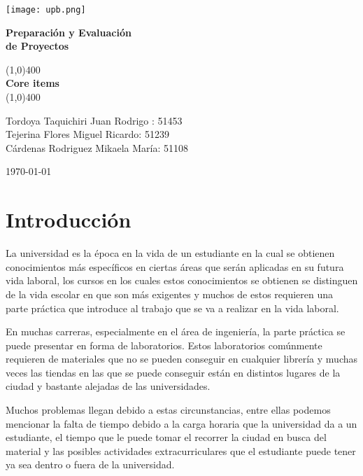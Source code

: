 \documentclass[11pt]{article}
\begin{document}
\begin{titlepage}
\begin{center}
\vspace*{2cm}

\texttt{[image: upb.png]}
\vfill

\Huge{\textbf{Preparación y Evaluación\\de Proyectos}}\\[5mm]

\vfill


\line(1,0){400}\\[3mm]
\Huge{\textbf{Core items}}\\[1mm]
\line(1,0){400}\\[2cm]
\begin{center}
\Large {Tordoya Taquichiri Juan Rodrigo : 51453\\Tejerina Flores Miguel Ricardo: 51239\\Cárdenas Rodriguez Mikaela Mar\'ia: 51108}

\end{center}

\vfill
\large{\today}
\end{center}
\end{titlepage}
\tableofcontents
\thispagestyle{empty}
\clearpage

\section{Introducción}
La universidad es la época en la vida de un estudiante en la cual se obtienen conocimientos más específicos en ciertas áreas que serán aplicadas en su futura vida laboral, los cursos en los cuales estos conocimientos se obtienen se distinguen de la vida escolar en que son más exigentes y muchos de estos requieren una parte práctica que introduce al trabajo que se va a realizar en la vida laboral.


En muchas carreras, especialmente en el área de ingeniería, la parte práctica se puede presentar en forma de laboratorios. Estos laboratorios comúnmente requieren de materiales que no se pueden conseguir en cualquier librería y muchas veces las tiendas en las que se puede conseguir están en distintos lugares de la ciudad y bastante alejadas de las universidades.


Muchos problemas llegan debido a estas circunstancias, entre ellas podemos mencionar la falta de tiempo debido a la carga horaria que la universidad da a un estudiante, el tiempo que le puede tomar el recorrer la ciudad en busca del material y las posibles actividades extracurriculares que el estudiante puede tener ya sea dentro o fuera de la universidad.
\end{document}
